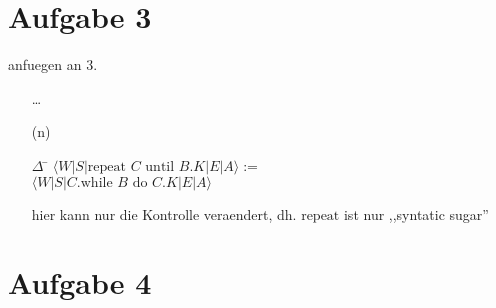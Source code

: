 \section*{Aufgabe 3}
anfuegen an $3.$
\begin{enumerate}
\item[] \ldots
\item[(n)]
    \begin{tabbing}
    $\Delta$ \= $\langle W | S | \text{repeat } C \text{ until } B.K | E | A \rangle :=$ \\
             \> $\langle W | S | C.\text{while }B \text{ do } C.K | E | A \rangle$
    \end{tabbing}
    hier kann nur die Kontrolle veraendert, dh. $\text{repeat}$ ist nur ,,syntatic sugar''
\end{enumerate}

\section*{Aufgabe 4}


